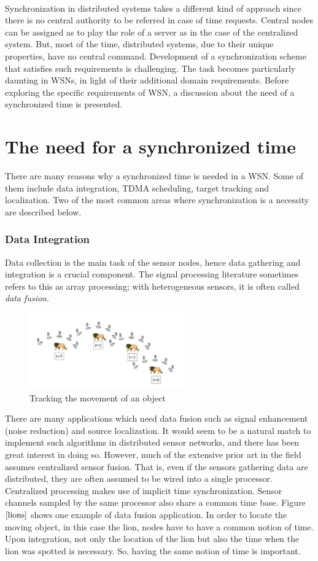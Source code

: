 \documentclass[a4paper,10pt]{report}
\begin{document}
\paragraph*{}
Synchronization in distributed systems takes a different kind of
approach since there is no central authority to be referred in case
of time requests. Central nodes can be assigned as to play the role
of a server as in the case of the centralized system. But, most of
the time, distributed systems, due to their unique properties, have
no central command. Development of a synchronization scheme that
satisfies such requirements is challenging. The task becomes
particularly daunting in WSNs, in light of their additional domain
requirements. Before exploring the specific requirements of WSN, a
discussion about the need of a synchronized time is presented.
\section{\textbf{The need for a synchronized time}}
There are many reasons why a synchronized time is needed in a WSN.
Some of them include data integration, TDMA scheduling, target
tracking and localization. Two of the most common areas where
synchronization is a necessity are described below.
\subsubsection{Data Integration}
Data collection is the main task of the sensor nodes, hence data
gathering and integration is a crucial component. The signal
processing literature sometimes refers to this as array processing;
with heterogeneous sensors, it is often called \textit{data fusion}.
\begin{figure}[b]
\centering
\includegraphics[width= 0.6\textwidth]{lions}
\caption{Tracking the movement of an object}
\label{lions}
\end{figure}
There are many applications which need data fusion such as signal
enhancement (noise reduction) and source localization. It would seem
to be a natural match to implement such algorithms in distributed
sensor networks, and there has been great interest in doing so.
However, much of the extensive prior art in the field assumes
centralized sensor fusion. That is, even if the sensors gathering
data are distributed, they are often assumed to be wired into a
single processor. Centralized processing makes use of implicit time
synchronization. Sensor channels sampled by the same processor also
share a common time base. Figure $\ref{lions}$ shows one example of
data fusion application. In order to locate the moving object, in
this case the lion, nodes have to have a common notion of time. Upon
integration, not only the location of the lion but also the time
when the lion was spotted is necessary. So, having the same notion
of time is important.
\end{document}
